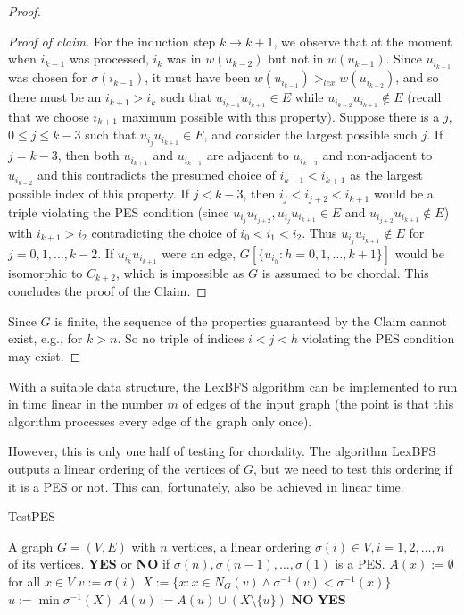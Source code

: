 \begin{proof}
\begin{proof}[Proof of claim]
		For the induction step $k \to k + 1$, we observe that at the moment when $i_{k-1}$ was processed, $i_k$ was in $w(u_{k-2})$ but not in $w(u_{k-1})$. Since $u_{i_{k-1}}$ was chosen for $\sigma(i_{k-1})$, it must have been $w(u_{i_{k-1}}) >_{lex} w(u_{i_{k-2}})$, and so there must be an $i_{k+1} > i_k$ such that $u_{i_{k-1}} u_{i_{k+1}} \in E$ while $u_{i_{k-2}} u_{i_{k+1}} \notin E$ (recall that we choose $i_{k+1}$ maximum possible with this property). Suppose there is a $j$, $0 \leq j \leq k - 3$ such that $u_{i_j} u_{i_{k+1}} \in E$, and consider the largest possible such $j$. If $j = k - 3$, then both $u_{i_{k+1}}$ and $u_{i_{k-1}}$ are adjacent to $u_{i_{k-3}}$ and non-adjacent to $u_{i_{k-2}}$ and this contradicts the presumed choice of
		$i_{k-1} < i_{k+1}$ as the largest possible index of this property. If $j < k - 3$, then $i_j < i_{j+2} < i_{k+1}$ would be	a triple violating the PES condition (since $u_{i_j} u_{i_{j+2}}, u_{i_j} u_{i_{k+1}} \in E$ and $u_{i_{j+2}} u_{i_{k+1}} \notin E$) with $i_{k+1} > i_2$ contradicting the choice of $i_0 < i_1 < i_2$. Thus $u_{i_j} u_{i_{k+1}} \notin E$ for $j = 0, 1, \dots, k - 2$. If $u_{i_k} u_{i_{k+1}}$ were an edge, $G[\{u_{i_h} : h = 0, 1, \dots, k + 1\}]$ would be isomorphic to $C_{k+2}$, which is impossible as $G$ is assumed to be chordal. This concludes the proof of the Claim.
	\end{proof}
	
	Since $G$ is finite, the sequence of the properties guaranteed by the Claim cannot exist, e.g., for $k > n$. So no triple of indices $i < j < h$ violating the PES condition may exist.
\end{proof}

With a suitable data structure, the LexBFS algorithm can be implemented to run in time linear in the number $m$ of edges of the input graph (the point is that this algorithm processes every edge of the graph only once).

However, this is only one half of testing for chordality. The algorithm LexBFS outputs a linear ordering of the vertices of $G$, but we need to test this ordering if it is a PES or not. This can, fortunately, also be achieved in linear time.

\begin{algorithm}[!ht]
	\caption{TestPES \faDog}
	\begin{algorithmic}[1]
		\Require A graph $G = (V, E)$ with $n$ vertices, a linear ordering $\sigma(i) \in V, i = 1, 2, \dots, n$ of its vertices.
		\Ensure \textbf{YES} or \textbf{NO} if $\sigma(n), \sigma(n-1), \dots, \sigma(1)$ is a PES.
		\State $A(x) := \emptyset$ for all $x \in V$
			\State $v:= \sigma(i)$
			\State $X:= \{x : x \in N_G (v) \land \sigma^{-1}(v) < \sigma^{-1}(x)\}$
				\State $u := \min \sigma^{-1}(X)$
				\State $A(u) := A(u) \cup (X \setminus \{u\})$
			\EndIf
				\State \Return \textbf{NO}
			\EndIf
		\EndFor
		\State \Return \textbf{YES} \faDog
	\end{algorithmic}
\end{algorithm}

